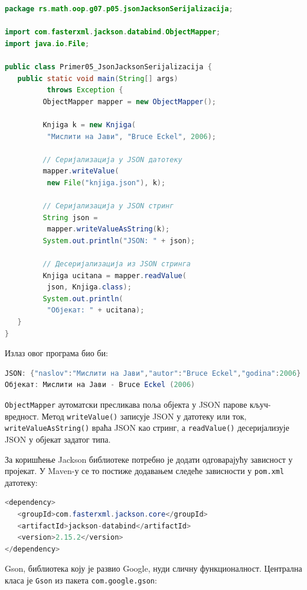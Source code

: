 \begin{lstlisting}[language=Java]
package rs.math.oop.g07.p05.jsonJacksonSerijalizacija;
 
import com.fasterxml.jackson.databind.ObjectMapper;
import java.io.File;
 
public class Primer05_JsonJacksonSerijalizacija {
   public static void main(String[] args)
          throws Exception {
         ObjectMapper mapper = new ObjectMapper();
 
         Knjiga k = new Knjiga(
          "Мислити на Јави", "Bruce Eckel", 2006);
 
         // Серијализација у JSON датотеку
         mapper.writeValue(
          new File("knjiga.json"), k);
 
         // Серијализација у JSON стринг
         String json =
          mapper.writeValueAsString(k);
         System.out.println("JSON: " + json);
 
         // Десеријализација из JSON стринга
         Knjiga ucitana = mapper.readValue(
          json, Knjiga.class);
         System.out.println(
          "Објекат: " + ucitana);
   }
}
\end{lstlisting}


Излаз овог програма био би:


\begin{lstlisting}[language=Java]
JSON: {"naslov":"Мислити на Јави","autor":"Bruce Eckel","godina":2006}
Објекат: Мислити на Јави - Bruce Eckel (2006)
\end{lstlisting}


\texttt{ObjectMapper} аутоматски пресликава поља објекта у JSON парове кључ-вредност. Метод \texttt{writeValue()} записује JSON у датотеку или ток, \texttt{writeValueAsString()} враћа JSON као стринг, а \texttt{readValue()} десеријализује JSON у објекат задатог типа.

За коришћење Jackson библиотеке потребно је додати одговарајућу зависност у пројекат. У Maven-у се то постиже додавањем следеће зависности у \texttt{pom.xml} датотеку:


\begin{lstlisting}[language=Java]
<dependency>
   <groupId>com.fasterxml.jackson.core</groupId>
   <artifactId>jackson-databind</artifactId>
   <version>2.15.2</version>
</dependency>
\end{lstlisting}


Gson, библиотека коју је развио Google, нуди сличну функционалност. Централна класа је \texttt{Gson} из пакета \texttt{com.google.gson}:


